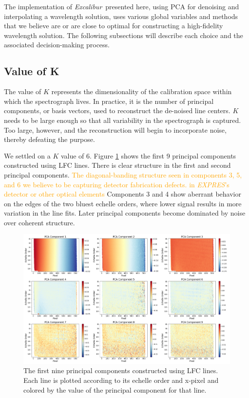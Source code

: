 \documentclass[modern]{aastex63}
\newcommand{\project}[1]{\textsl{#1}}
\newcommand{\name}{\project{Excalibur}}
\newcommand{\acronym}[1]{{\small{#1}}}
\newcommand{\expres}{\project{\acronym{EXPRES}}}
\newcommand{\lz}[1]{\textcolor{orange}{#1}}
\begin{document}
The implementation of \name\ presented here, using PCA for denoising and interpolating a wavelength solution, uses various global variables and methods that we believe are or are close to optimal for constructing a high-fidelity wavelength solution.  The following subsections will describe each choice and the associated decision-making process.

\subsection{Value of K}
\label{sec:choice_k}
The value of $K$ represents the dimensionality of the calibration space within which the spectrograph lives.  In practice, it is the number of principal components, or basis vectors, used to reconstruct the de-noised line centers.  $K$ needs to be large enough so that all variability in the spectrograph is captured.  Too large, however, and the reconstruction will begin to incorporate noise, thereby defeating the purpose.

We settled on a $K$ value of 6.  Figure \ref{fig:pcLfc} shows the first 9 principal components constructed using LFC lines.  There is clear structure in the first and second principal components.  \lz{The diagonal-banding structure seen in components 3, 5, and 6 we believe to be capturing detector fabrication defects. in \expres's detector or other optical elements}  Components 3 and 4 show aberrant behavior on the edges of the two bluest echelle orders, where lower signal results in more variation in the line fits.  Later principal components become dominated by noise over coherent structure.

\begin{figure}[t]
\centering
\includegraphics[width=\textwidth]{Figures/pcsLfc9.png}
\caption{The first nine principal components constructed using LFC lines.  Each line is plotted according to its echelle order and x-pixel and colored by the value of the principal component for that line.}
\label{fig:pcLfc}
\end{figure}
\end{document}
